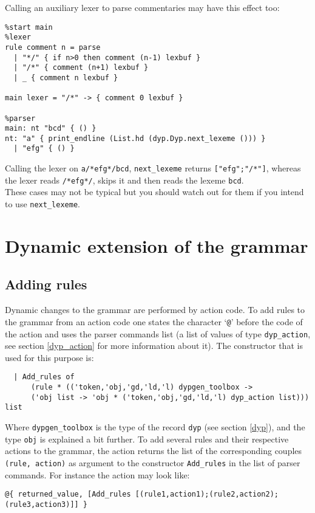 \documentclass[12pt]{article}
\begin{document}
{Calling an auxiliary lexer to parse commentaries may have this effect too:
\begin{verbatim}
%start main
%lexer
rule comment n = parse
  | "*/" { if n>0 then comment (n-1) lexbuf }
  | "/*" { comment (n+1) lexbuf }
  | _ { comment n lexbuf }

main lexer = "/*" -> { comment 0 lexbuf }

%parser
main: nt "bcd" { () }
nt: "a" { print_endline (List.hd (dyp.Dyp.next_lexeme ())) }
  | "efg" { () }
\end{verbatim}
Calling the lexer on \verb|a/*efg*/bcd|, \verb|next_lexeme| returns \verb|["efg";"/*"]|, whereas the lexer reads \verb|/*efg*/|, skips it and then reads the lexeme \verb|bcd|.\\

These cases may not be typical but you should watch out for them if you intend to use \verb|next_lexeme|.

\section{Dynamic extension of the grammar}\label{grammar-extension}

\subsection{Adding rules}\label{adding rules}

Dynamic changes to the grammar are performed by action code. To add rules to the grammar from an action code one states the character `\verb|@|' before the code of the action and uses the parser commands list (a list of values of type \verb|dyp_action|, see section \ref{dyp_action} for more information about it). The constructor that is used for this purpose is:
\begin{verbatim}
  | Add_rules of
      (rule * (('token,'obj,'gd,'ld,'l) dypgen_toolbox ->
      ('obj list -> 'obj * ('token,'obj,'gd,'ld,'l) dyp_action list))) list
\end{verbatim}
Where \verb|dypgen_toolbox| is the type of the record \verb|dyp| (see section \ref{dyp}), and the type \verb|obj| is explained a bit further. To add several rules and their respective actions to the grammar, the action returns the list of the corresponding couples \texttt{(rule, action)} as argument to the constructor \verb|Add_rules| in the list of parser commands. For instance the action may look like:\\
\begin{verbatim}
@{ returned_value, [Add_rules [(rule1,action1);(rule2,action2);(rule3,action3)]] }
\end{verbatim}

}
\end{document}
